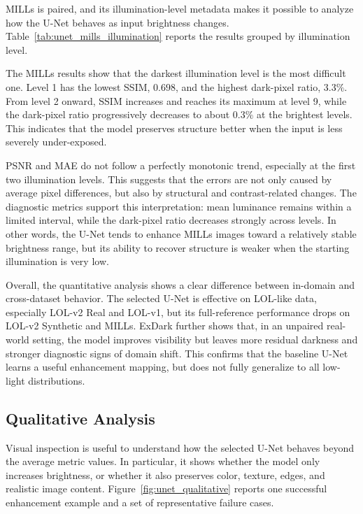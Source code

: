 MILLs is paired, and its illumination-level metadata makes it possible to analyze how the U-Net behaves as input brightness changes. Table~\ref{tab:unet_mills_illumination} reports the results grouped by illumination level.



The MILLs results show that the darkest illumination level is the most difficult one. Level 1 has the lowest SSIM, $0.698$, and the highest dark-pixel ratio, $3.3\%$. From level 2 onward, SSIM increases and reaches its maximum at level 9, while the dark-pixel ratio progressively decreases to about $0.3\%$ at the brightest levels. This indicates that the model preserves structure better when the input is less severely under-exposed.

PSNR and MAE do not follow a perfectly monotonic trend, especially at the first two illumination levels. This suggests that the errors are not only caused by average pixel differences, but also by structural and contrast-related changes. The diagnostic metrics support this interpretation: mean luminance remains within a limited interval, while the dark-pixel ratio decreases strongly across levels. In other words, the U-Net tends to enhance MILLs images toward a relatively stable brightness range, but its ability to recover structure is weaker when the starting illumination is very low.

Overall, the quantitative analysis shows a clear difference between in-domain and cross-dataset behavior. The selected U-Net is effective on LOL-like data, especially LOL-v2 Real and LOL-v1, but its full-reference performance drops on LOL-v2 Synthetic and MILLs. ExDark further shows that, in an unpaired real-world setting, the model improves visibility but leaves more residual darkness and stronger diagnostic signs of domain shift. This confirms that the baseline U-Net learns a useful enhancement mapping, but does not fully generalize to all low-light distributions.

\subsection{Qualitative Analysis}

Visual inspection is useful to understand how the selected U-Net behaves beyond the average metric values. In particular, it shows whether the model only increases brightness, or whether it also preserves color, texture, edges, and realistic image content. Figure~\ref{fig:unet_qualitative} reports one successful enhancement example and a set of representative failure cases.

